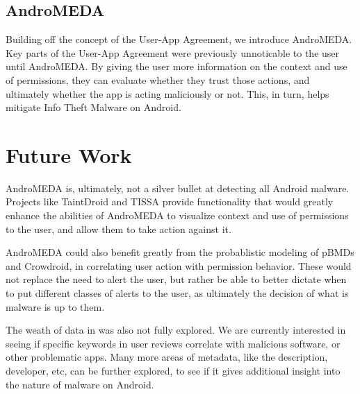 \subsection{AndroMEDA}
Building off the concept of the User-App Agreement, we introduce AndroMEDA. Key parts of the User-App Agreement were previously unnoticable to the user until AndroMEDA. By giving the user more information on the context and use of permissions, they can evaluate whether they trust those actions, and ultimately whether the app is acting maliciously or not. This, in turn, helps mitigate Info Theft Malware on Android.

\section{Future Work}
\label{sec:futurework}
AndroMEDA is, ultimately, not a silver bullet at detecting all Android malware. Projects like TaintDroid and TISSA provide functionality that would greatly enhance the abilities of AndroMEDA to visualize context and use of permissions to the user, and allow them to take action against it. 

AndroMEDA could also benefit greatly from the probablistic modeling of pBMDs and Crowdroid, in correlating user action with permission behavior. These would not replace the need to alert the user, but rather be able to better dictate when to put different classes of alerts to the user, as ultimately the decision of what is malware is up to them.

The weath of data in  was also not fully explored. We are currently interested in seeing if specific keywords in user reviews correlate with malicious software, or other problematic apps. Many more areas of metadata, like the description, developer, etc, can be further explored, to see if it gives additional insight into the nature of malware on Android.